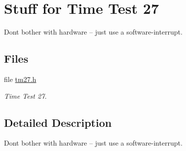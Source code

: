 \hypertarget{group__m68k__tm27}{}\section{Stuff for Time Test 27}
\label{group__m68k__tm27}


Don\textquotesingle{}t bother with hardware -- just use a software-\/interrupt.  


\subsection*{Files}
\begin{DoxyCompactItemize}
\item 
file \mbox{\hyperlink{m68k_2gen68360_2include_2tm27_8h}{tm27.\+h}}
\begin{DoxyCompactList}\small\item\em Time Test 27. \end{DoxyCompactList}\end{DoxyCompactItemize}


\subsection{Detailed Description}
Don\textquotesingle{}t bother with hardware -- just use a software-\/interrupt. 

